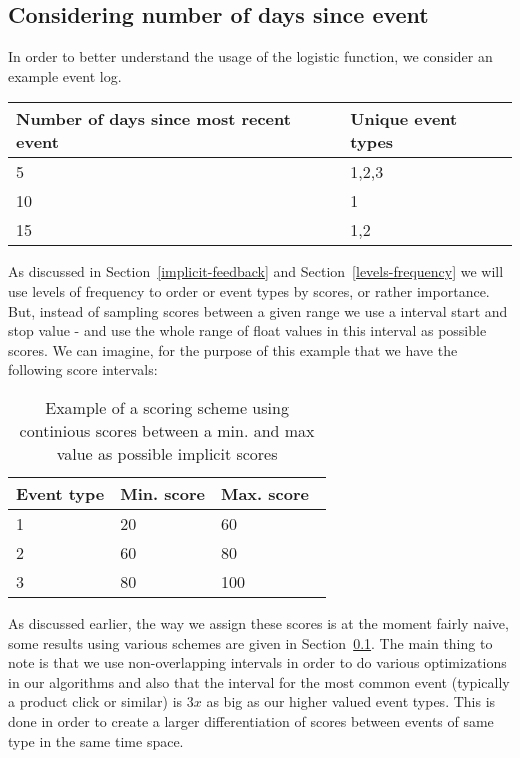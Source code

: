 \subsection{Considering number of days since event}

In order to better understand the usage of the logistic function, we consider
an example event log.

\begin{table}[H]
  \centering
  \label{events-example}
  \begin{tabular}{p{4cm}m{3cm}}
    \toprule
    Number of days since most recent event & Unique event types \\
    \midrule
    5 & 1,2,3 \\
    10 & 1 \\
    15 & 1,2 \\
    \bottomrule
  \end{tabular}
\end{table}

As discussed in Section~\ref{implicit-feedback} and
Section~\ref{levels-frequency} we will use levels of frequency to order or
event types by scores, or rather importance. But, instead of sampling scores
between a given range we use a interval start and stop value - and use the
whole range of float values in this interval as possible scores. We can
imagine, for the purpose of this example that we have the following score
intervals:

\begin{table}[H]
  \centering
  \label{implicit-example-scores}
  \begin{tabular}{lll}
    \toprule
    Event type & Min. score & Max. score \\
    \midrule
    1 & 20 & 60 \\
    2 & 60 & 80 \\
    3 & 80 & 100 \\
    \bottomrule
  \end{tabular}
  \caption{Example of a scoring scheme using continious scores between a min.
  and max value as possible implicit scores}
\end{table}

As discussed earlier, the way we assign these scores is at the moment fairly
naive, some results using various schemes are given in Section~\ref{}. The main
thing to note is that we use non-overlapping intervals in order to do various
optimizations in our algorithms and also that the interval for the most common
event (typically a product click or similar) is $3x$ as big as our higher
valued event types. This is done in order to create a larger differentiation
of scores between events of same type in the same time space.

